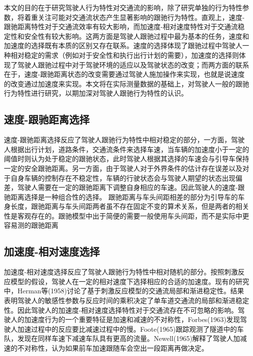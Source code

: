 本文的目的在于研究驾驶人行为特性对交通流的影响，除了研究单独的行为特性参数，将着重关注可能对交通流状态产生显著影响的跟驰行为特性。直观上，速度-跟驰距离特性对于交通流效率有较大影响，而加速度-相对速度特性对于交通流稳定性和安全性有较大影响。这两方面是驾驶人跟驰过程中最为基本的任务，速度和加速度的选择既有本质的区别又存在联系。速度的选择体现了跟驰过程中驾驶人一种相对稳定的需求（例如对于安全性和执行出行计划的需要），加速度的选择则体现了驾驶人跟驰过程中对于驾驶环境的适应以及驾驶状态的改变；而两方面的联系在于，速度-跟驰距离状态的改变需要通过驾驶人施加操作来实现，也就是说速度的改变通过加速度来实现。本文将在实际测量数据的基础上，对驾驶人一般的跟驰行为特性进行研究，以期加深对驾驶人跟驰行为特性的认识。

\subsection{速度-跟驰距离选择}
速度-跟驰距离选择反应了驾驶人跟驰行为特性中相对稳定的部分，一方面，驾驶人根据出行计划，道路条件，交通流条件来选择车速，当车辆的加速度小于一定的阈值时则认为处于稳定的跟驰状态，此时驾驶人根据其选择的车速会与引导车保持一定的安全跟驰距离。另一方面，由于驾驶人对于外界条件的估计存在误差以及对于自身车辆的控制存在不稳定性，车辆的行驶状态会与驾驶人期望的状态出现偏差，驾驶人需要在一定的跟驰距离下调整自身相应的车速。因此驾驶人的速度-跟驰距离选择是一种组合性的选择。
跟驰距离与车头间距相差的部分为引导车的车身长度，跟驰距离与车头间距两者虽不存在固定不变的算术关系，但是两者的相关性是客观存在的。跟驰模型中出于简便的需要一般使用车头间距，而不是实际中更容易测的跟驰距离
%

\subsection{加速度-相对速度选择}
加速度-相对速度选择反应了驾驶人跟驰行为特性中相对随机的部分。按照刺激反应模型的假设，驾驶人在一定的相对速度下选择相应的合适的加速度。现有的研究中，Herman等(1958)讨论了基于刺激反应模型的交通流局部和渐进稳定性\cite{Herman1959}。结果表明驾驶人的敏感性参数与反应时间的乘积决定了单车道交通流的局部和渐进稳定性。因此驾驶人的加速度-相对速度选择特性对于交通流存在不可忽略的影响。驾驶人的加速度行为的一个重要特征是加速和减速的不对称性，Forbes(1963)发现驾驶人加速过程中的反应要比减速过程中的慢\cite{Forbes1963}。Foote(1965)跟踪观测了隧道中的车队，发现在同样车速下减速车队具有更高的流量\cite{Foote1965}。Newell(1965)解释了驾驶人加减速的不对称性，认为如果前车加速跟随车会空出一段距离再做决定\cite{Newell1965}。

